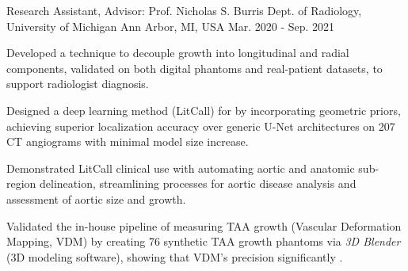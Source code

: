 \begin{cventries}
 \cventry
    {Research Assistant, Advisor: Prof. Nicholas S. Burris} %
    {Dept. of Radiology, University of Michigan } %
    {Ann Arbor, MI, USA} %
    {Mar. 2020 - Sep. 2021} %
    {
      \begin{cvitems} %
	\item{Developed a technique to decouple  growth into longitudinal and radial components, validated on both digital phantoms and real-patient  datasets, to support radiologist diagnosis.}
	\item{Designed a deep learning method (LitCall) for  by incorporating geometric priors, achieving superior localization accuracy over generic U-Net architectures on 207 CT angiograms with minimal model size increase.}
	\item{Demonstrated LitCall clinical use with automating aortic  and anatomic sub-region delineation, streamlining processes for aortic disease analysis and assessment of aortic size and growth.}
	\item{Validated the in-house pipeline of measuring TAA growth (Vascular Deformation Mapping, VDM) by creating 76 synthetic TAA growth phantoms via \textit{3D Blender} (3D modeling software), showing that VDM's precision significantly .}
       \end{cvitems}
    }
    
\end{cventries}

